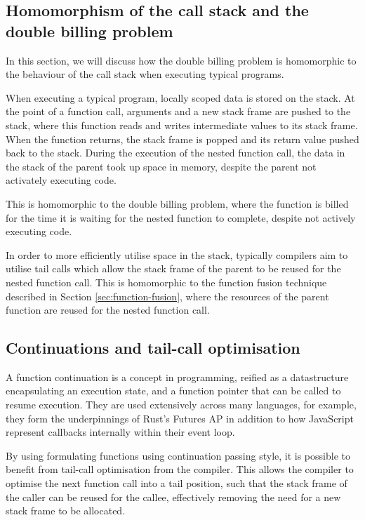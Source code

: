 \subsection{Homomorphism of the call stack and the double billing problem}
In this section, we will discuss how the double billing problem is homomorphic to the behaviour of the call stack when executing typical programs.

When executing a typical program, locally scoped data is stored on the stack. At the point of a function call, arguments and a new stack frame are pushed to the stack, where this function reads and writes intermediate values to its stack frame. When the function returns, the stack frame is popped and its return value pushed back to the stack. During the execution of the nested function call, the data in the stack of the parent took up space in memory, despite the parent not activately executing code.

This is homomorphic to the double billing problem, where the function is billed for the time it is waiting for the nested function to complete, despite not actively executing code.

In order to more efficiently utilise space in the stack, typically compilers aim to utilise tail calls which allow the stack frame of the parent to be reused for the nested function call. This is homomorphic to the function fusion technique described in Section \ref{sec:function-fusion}, where the resources of the parent function are reused for the nested function call.

\subsection{Continuations and tail-call optimisation}
A function continuation is a concept in programming\cite{sussmanSCHEMEInterpreterExtended1975}, reified as a datastructure encapsulating an execution state, and a function pointer that can be called to resume execution. They are used extensively across many languages, for example, they form the underpinnings of Rust's Futures AP in addition to how JavaScript represent callbacks internally within their event loop.

By using formulating functions using continuation passing style, it is possible to benefit from tail-call optimisation from the compiler. This allows the compiler to optimise the next function call into a tail position, such that the stack frame of the caller can be reused for the callee, effectively removing the need for a new stack frame to be allocated.

